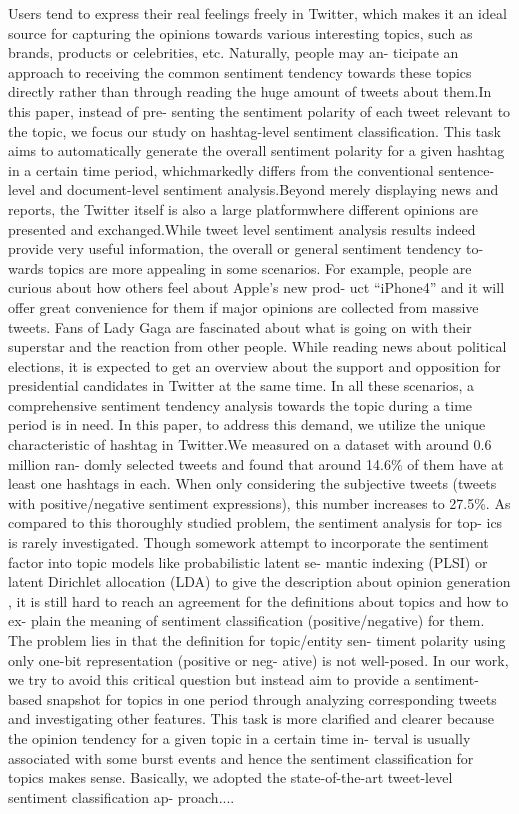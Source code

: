 \documentclass[runningheads,a4paper]{llncs}
\begin{document}
Users tend to express their real feelings freely in Twitter, which makes it an ideal source for capturing the opinions towards various interesting topics, such as brands, products or celebrities, etc. Naturally, people may an- ticipate an approach to receiving the common sentiment tendency towards these topics directly rather than through reading the huge amount of tweets about them.In this paper, instead of pre- senting the sentiment polarity of each tweet relevant to the topic, we focus our study on hashtag-level sentiment classification. This task aims to automatically generate the overall sentiment polarity for a given hashtag in a certain time period, whichmarkedly differs from the conventional sentence-level and document-level sentiment analysis.Beyond merely displaying news and reports, the Twitter itself is also a large platformwhere different opinions are presented and exchanged.While tweet level sentiment analysis results indeed provide very useful information, the overall or general sentiment tendency to- wards topics are more appealing in some scenarios. For example, people are curious about how others feel about Apple’s new prod- uct “iPhone4” and it will offer great convenience for them if major opinions are collected from massive tweets. Fans of Lady Gaga are fascinated about what is going on with their superstar and the reaction from other people. While reading news about political elections, it is expected to get an overview about the support and opposition for presidential candidates in Twitter at the same time. In all these scenarios, a comprehensive sentiment tendency analysis towards the topic during a time period is in need. In this paper, to address this demand, we utilize the unique characteristic of hashtag in Twitter.We measured on a dataset with around 0.6 million ran- domly selected tweets and found that around 14.6\% of them have at least one hashtags in each. When only considering the subjective tweets (tweets with positive/negative sentiment expressions), this number increases to 27.5\%. As compared to this thoroughly studied problem, the sentiment analysis for top- ics is rarely investigated. Though somework attempt to incorporate the sentiment factor into topic models like probabilistic latent se- mantic indexing (PLSI) or latent Dirichlet allocation (LDA) to give the description about opinion generation \cite{lin2009joint,mei2007topic}, it is still hard to reach an agreement for the definitions about topics and how to ex- plain the meaning of sentiment classification (positive/negative) for them. The problem lies in that the definition for topic/entity sen- timent polarity using only one-bit representation (positive or neg- ative) is not well-posed. In our work, we try to avoid this critical question but instead aim to provide a sentiment-based snapshot for topics in one period through analyzing corresponding tweets and investigating other features. This task is more clarified and clearer because the opinion tendency for a given topic in a certain time in- terval is usually associated with some burst events and hence the sentiment classification for topics makes sense.
Basically, we adopted the state-of-the-art tweet-level sentiment classification ap- proach....
 \cite{wang2011topic}
 
\end{document}
